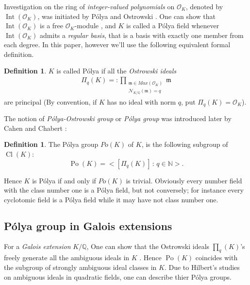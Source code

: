 \documentclass{jams-l}
\theoremstyle{definition}
\newtheorem{definition}[theorem]{Definition}
\theoremstyle{remark}
\numberwithin{equation}{section}
\DeclareMathOperator{\Po}{Po}
\DeclareMathOperator{\Cl}{Cl}
\DeclareMathOperator{\Int}{Int}
\begin{document}
Investigation on the ring of \textit{integer-valued polynomials} on $\mathcal{O}_K$, denoted by $\Int(\mathcal{O}_K)$, was initiated by  P\'olya \cite{Polya} and Ostrowski \cite{Ostro}. One can show that  $\Int(\mathcal{O}_K)$ is a free $\mathcal{O}_K$-module \cite[Section 2]{Zantema}, and $K$ is called a P\'olya field whenever $\Int(\mathcal{O}_K)$ admits a \textit{regular basis}, that is a basis with exactly one member from each degree. In this paper, however we'll use the following equivalent formal definition.
\begin{definition}\cite{Zantema}
$K$ is called P\'olya if all the \textit{Ostrowski ideals}  \cite{Ostro}
\begin{align*}
\Pi_q(K)=:\prod_{\substack{\mathfrak{m}\in Max(\mathcal{O}_K)\\ \mathcal{N}_{K/ \mathbb{Q}}(\mathfrak{m})=q}} \mathfrak{m}
\end{align*}
 are principal (By convention, if $K$ has no ideal with norm $q$, put $\Pi_q(K)=\mathcal{O}_K$).
\end{definition}

The notion of \textit{P\'olya-Ostrowski group} or \textit{P\'olya group} was introduced later by Cahen and Chabert \cite{Cahen-Chabert's book}:
\begin{definition} \label{definition, Polya group}
The P\'olya group $Po(K)$ of  $K$, is the following subgroup of $\Cl(K)$:
\begin{equation*}
\Po(K)=<\left[\Pi_q(K)\right] \, : \, q \in \mathbb{N}>.
\end{equation*}
\end{definition} 

Hence $K$ is P\'olya if and only if $Po(K)$ is trivial. Obviously every number field with the class number one is a P\'olya field, but not conversely; for instance every cyclotomic field is a P\'olya field \cite[Proposition 2.6]{Zantema}  while it may have not class number one.
\subsection{P\'olya group in Galois extensions}
For a \textit{Galois extension} $K/\mathbb{Q}$, One can show that the Ostrowski ideals $\prod_q(K)$'s freely generate all the ambiguous ideals in $K$ \cite[Section 2]{Brumer}. Hence $\Po(K)$ coincides with the subgroup of strongly ambiguous ideal classes in $K$. 
Due to Hilbert's studies on ambiguous ideals in quadratic fields, one can describe thier P\'olya groups.
\end{document}
